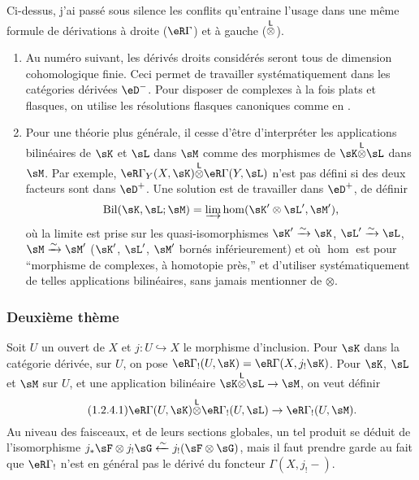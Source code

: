 Ci-dessus, j'ai passé sous silence les conflits qu'entraine l'usage dans une 
même formule de dérivations à droite ($\eR\Gamma$) et à gauche 
(${\overset{\mathsf{L}}{\otimes}}$). 
\begin{enumerate}[\indent a)]
  \item Au numéro suivant, les dérivés droits considérés seront tous 
    de dimension cohomologique finie. Ceci permet de travailler 
    systématiquement dans les catégories dérivées $\eD^-$. Pour disposer 
    de complexes à la fois plats et flasques, on utilise les résolutions 
    flasques canoniques comme en \cite[XVII]{sga4}. 
  \item Pour une théorie plus générale, il cesse d'être d'interpréter 
    les applications bilinéaires de $\sK$ et $\sL$ dans $\sM$ comme des 
    morphismes de $\sK\lotimes\sL$ dans $\sM$. Par exemple, 
    $\eR\Gamma_Y(X,\sK)\lotimes\eR\Gamma(Y,\sL)$ n'est pas défini si des deux 
    facteurs sont dans $\eD^+$. Une solution est de travailler dans $\eD^+$, de 
    définir 
    \[
      \operatorname{Bil}(\sK,\sL;\sM) = \varinjlim \hom(\sK'\otimes\sL',\sM') \text{,}
    \]
    où la limite est prise sur les quasi-isomorphismes $\sK'\iso \sK$, 
    $\sL'\iso \sL$, $\sM\iso \sM'$ ($\sK'$, $\sL'$, $\sM'$ bornés 
    inférieurement) et où $\hom$ est pour ``morphisme de complexes, à 
    homotopie près,'' et d'utiliser systématiquement de telles applications 
    bilinéaires, sans jamais mentionner de $\otimes$.  
\end{enumerate}




\subsubsection{Deuxième thème}\label{IV:1-2-4}

Soit $U$ un ouvert de $X$ et $j:U\hookrightarrow X$ le morphisme d'inclusion. 
Pour $\sK$ dans la catégorie dérivée, sur $U$, on pose 
$\eR\Gamma_!(U,\sK)=\eR\Gamma(X,j_!\sK)$. Pour $\sK$, $\sL$ et $\sM$ sur $U$, et 
une application bilinéaire $\sK\lotimes\sL\to\sM$, on veut définir 
\begin{equation*}\tag{1.2.4.1}\label{IV:eq:1-2-4-1}
  \eR\Gamma(U,\sK)\lotimes\eR\Gamma_!(U,\sL)\to\eR\Gamma_!(U,\sM) \text{.}
\end{equation*}
Au niveau des faisceaux, et de leurs sections globales, un tel produit se 
déduit de l'isomorphisme 
$j_*\sF\otimes j_!\sG\xleftarrow\sim j_!(\sF\otimes \sG)$, mais il faut prendre 
garde au fait que $\eR\Gamma_!$ n'est en général pas le dérivé du 
foncteur $\Gamma(X,j_!-)$. 

